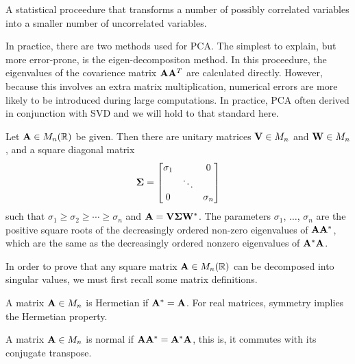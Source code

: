 \begin{defn}
  A statistical proceedure that transforms a number of possibly correlated variables into a smaller number of uncorrelated variables.
\end{defn}

In practice, there are two methods used for \gls{PCA}.  The simplest to explain, but more error-prone, is the eigen-decompositon
method\cite{}.  In this proceedure, the eigenvalues of the covarience matrix $\mathbf{A}\mathbf{A}^T$ are calculated directly.  However,
because this involves an extra matrix multiplication, numerical errors are more likely to be introduced during large computations.
In practice, \gls{PCA} often derived in conjunction with \gls{SVD} and we will hold to that standard here.

\begin{thm}
  Let $\mathbf{A} \in M_{n}(\mathbb{R})$ be given. Then there are unitary matrices $\mathbf{V} \in M_n$ and $\mathbf{W} \in M_n$, and a square diagonal
  matrix
  \[
    \mathbf{\Sigma} =
      \begin{bmatrix}
        \sigma_1 &        & 0        \\
                 & \ddots &          \\
        0        &        & \sigma_n \\
      \end{bmatrix}
  \]
  such that $\sigma_1 \geq \sigma_2 \geq \cdots \geq \sigma_n$ and $\mathbf{A} = \mathbf{V}\mathbf{\Sigma}\mathbf{W}^*$.  The parameters $\sigma_1$,
  $\hdots$, $\sigma_n$ are the positive square roots of the decreasingly ordered non-zero eigenvalues of $\mathbf{A}\mathbf{A}^*$, which are the
  same as the decreasingly ordered nonzero eigenvalues of $\mathbf{A}^*\mathbf{A}$.

\end{thm}

In order to prove that any square matrix $\mathbf{A} \in M_n(\mathbb{R})$ can be decomposed into singular values, we must first recall some
matrix definitions.

\begin{defn}
  A matrix $\mathbf{A} \in M_n$ is \textnormal{Hermetian} if $\mathbf{A}^* =  \mathbf{A}$.  For real matrices, symmetry implies the Hermetian property.
\end{defn}

\begin{defn}
  A matrix $\mathbf{A} \in M_n$ is \textnormal{normal} if $\mathbf{A}\mathbf{A}^* = \mathbf{A}^*\mathbf{A}$, this is, it commutes with its conjugate transpose.
\end{defn}

